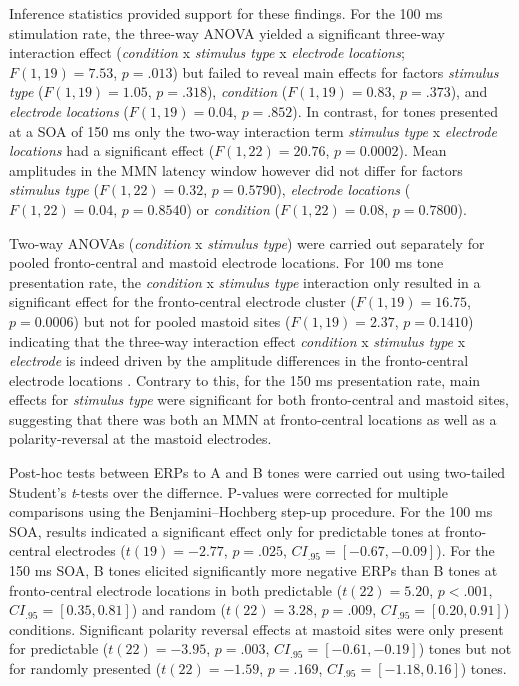 \documentclass[stu,a4paper,12pt, nofontenc, babel, american]{apa7}
\begin{document}


Inference statistics provided support for these findings. For the 100 ms
stimulation rate, the three-way ANOVA yielded a significant three-way
interaction effect (\emph{condition} x \emph{stimulus type} x
\emph{electrode locations}; \(F(1,19) = 7.53\), \(p = .013\)) but failed
to reveal main effects for factors \emph{stimulus type}
(\(F(1,19) = 1.05\), \(p = .318\)), \emph{condition}
(\(F(1,19) = 0.83\), \(p = .373\)), and \emph{electrode locations}
(\(F(1,19) = 0.04\), \(p = .852\)). In contrast, for tones presented at
a SOA of 150 ms only the two-way interaction term \emph{stimulus type} x
\emph{electrode locations} had a significant effect
(\(F(1,22) = 20.76\), \(p = 0.0002\)). Mean amplitudes in the MMN
latency window however did not differ for factors \emph{stimulus type}
(\(F(1,22) = 0.32\), \(p = 0.5790\)), \emph{electrode locations}
(\(F(1,22) = 0.04\), \(p = 0.8540\)) or \emph{condition}
(\(F(1,22) = 0.08\), \(p = 0.7800\)).



Two-way ANOVAs (\emph{condition} x \emph{stimulus type}) were carried
out separately for pooled fronto-central and mastoid electrode
locations. For 100 ms tone presentation rate, the \emph{condition} x
\emph{stimulus type} interaction only resulted in a significant effect
for the fronto-central electrode cluster (\(F(1,19) = 16.75\),
\(p = 0.0006\)) but not for pooled mastoid sites (\(F(1,19) = 2.37\),
\(p = 0.1410\)) indicating that the three-way interaction effect
\emph{condition} x \emph{stimulus type} x \emph{electrode} is indeed
driven by the amplitude differences in the fronto-central electrode
locations . Contrary to this, for the 150 ms presentation rate, main
effects for \emph{stimulus type} were significant for both
fronto-central and mastoid sites, suggesting that there was both an MMN
at fronto-central locations as well as a polarity-reversal at the
mastoid electrodes.



Post-hoc tests between ERPs to A and B tones were carried out using
two-tailed Student's \emph{t}-tests over the differnce. P-values were
corrected for multiple comparisons using the Benjamini--Hochberg step-up
procedure. For the 100 ms SOA, results indicated a significant effect
only for predictable tones at fronto-central electrodes
(\(t(19) = -2.77\), \(p = .025\), \(CI_{.95} = [-0.67,-0.09]\)). For the
150 ms SOA, B tones elicited significantly more negative ERPs than B
tones at fronto-central electrode locations in both predictable
(\(t(22) = 5.20\), \(p < .001\), \(CI_{.95} = [0.35,0.81]\)) and random
(\(t(22) = 3.28\), \(p = .009\), \(CI_{.95} = [0.20,0.91]\)) conditions.
Significant polarity reversal effects at mastoid sites were only present
for predictable (\(t(22) = -3.95\), \(p = .003\),
\(CI_{.95} = [-0.61,-0.19]\)) tones but not for randomly presented
(\(t(22) = -1.59\), \(p = .169\), \(CI_{.95} = [-1.18,0.16]\)) tones.
\end{document}
